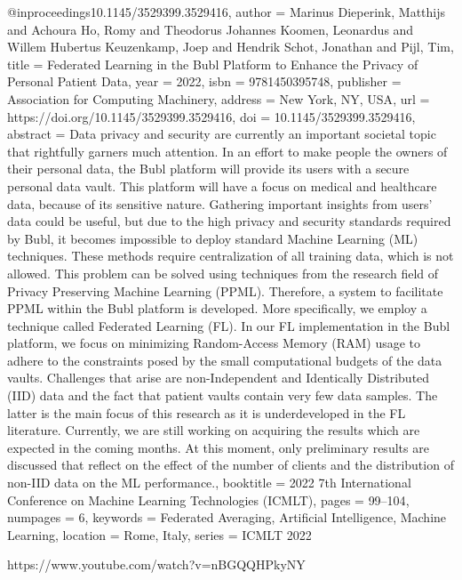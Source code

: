 @inproceedings{10.1145/3529399.3529416,
author = {Marinus Dieperink, Matthijs and Achoura Ho, Romy and Theodorus Johannes Koomen, Leonardus and Willem Hubertus Keuzenkamp, Joep and Hendrik Schot, Jonathan and Pijl, Tim},
title = {Federated Learning in the Bubl Platform to Enhance the Privacy of Personal Patient Data},
year = {2022},
isbn = {9781450395748},
publisher = {Association for Computing Machinery},
address = {New York, NY, USA},
url = {https://doi.org/10.1145/3529399.3529416},
doi = {10.1145/3529399.3529416},
abstract = {Data privacy and security are currently an important societal topic that rightfully garners much attention. In an effort to make people the owners of their personal data, the Bubl platform will provide its users with a secure personal data vault. This platform will have a focus on medical and healthcare data, because of its sensitive nature. Gathering important insights from users’ data could be useful, but due to the high privacy and security standards required by Bubl, it becomes impossible to deploy standard Machine Learning (ML) techniques. These methods require centralization of all training data, which is not allowed. This problem can be solved using techniques from the research field of Privacy Preserving Machine Learning (PPML). Therefore, a system to facilitate PPML within the Bubl platform is developed. More specifically, we employ a technique called Federated Learning (FL). In our FL implementation in the Bubl platform, we focus on minimizing Random-Access Memory (RAM) usage to adhere to the constraints posed by the small computational budgets of the data vaults. Challenges that arise are non-Independent and Identically Distributed (IID) data and the fact that patient vaults contain very few data samples. The latter is the main focus of this research as it is underdeveloped in the FL literature. Currently, we are still working on acquiring the results which are expected in the coming months. At this moment, only preliminary results are discussed that reflect on the effect of the number of clients and the distribution of non-IID data on the ML performance.},
booktitle = {2022 7th International Conference on Machine Learning Technologies (ICMLT)},
pages = {99–104},
numpages = {6},
keywords = {Federated Averaging, Artificial Intelligence, Machine Learning},
location = {Rome, Italy},
series = {ICMLT 2022}
}

https://www.youtube.com/watch?v=nBGQQHPkyNY